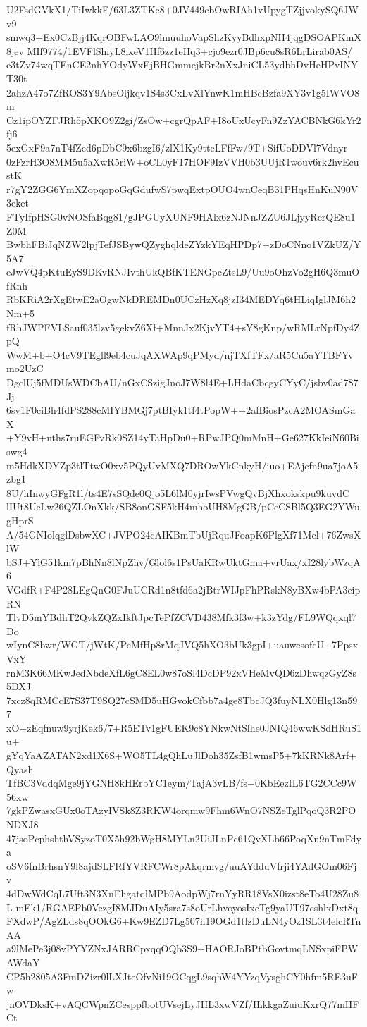 U2FsdGVkX1/TiIwkkF/63L3ZTKe8+0JV449cbOwRIAh1vUpygTZjjvokySQ6JWv9
smwq3+Ex0CzBjj4KqrOBFwLAO9lmuuhoVapShzKyyBdhxpNH4jqgDSOAPKmX8jev
MIf9774/1EVFlShiyL8ixeV1Hf6zz1eHq3+cjo9ezr0JBp6cu8sR6LrLirab0AS/
c3tZv74wqTEnCE2nhYOdyWxEjBHGmmejkBr2nXxJniCL53ydbhDvHeHPvINYT30t
2ahzA47o7ZfROS3Y9AbsOljkqv1S4s3CxLvXlYnwK1mHBcBzfa9XY3v1g5IWVO8m
Cz1ipOYZFJRh5pXKO9Z2gi/ZsOw+cgrQpAF+I8oUxUcyFn9ZzYACBNkG6kYr2fj6
5exGxF9a7nT4fZcd6pDbC9x6bzgI6/zlX1Ky9tteLFfFw/9T+SifUoDDVl7Vdnyr
0zFzrH3O8MM5u5aXwR5riW+oCL0yF17HOF9IzVVH0b3UUjR1wouv6rk2hvEcustK
r7gY2ZGG6YmXZopqopoGqGdufwS7pwqExtpOUO4wnCeqB31PHqsHnKuN90V3eket
FTyIfpHSG0vNOSfaBqg81/gJPGUyXUNF9HAlx6zNJNnJZZU6JLjyyRcrQE8u1Z0M
BwbhFBiJqNZW2lpjTefJSBywQZyghqldeZYzkYEqHPDp7+zDoCNno1VZkUZ/Y5A7
eJwVQ4pKtuEyS9DKvRNJIvthUkQBfKTENGpcZtsL9/Uu9oOhzVo2gH6Q3muOfRnh
RbKRiA2rXgEtwE2aOgwNkDREMDn0UCzHzXq8jzI34MEDYq6tHLiqIglJM6h2Nm+5
fRhJWPFVLSauf035lzv5gekvZ6Xf+MnnJx2KjvYT4+sY8gKnp/wRMLrNpfDy4ZpQ
WwM+b+O4cV9TEgll9eb4cuJqAXWAp9qPMyd/njTXfTFx/aR5Cu5aYTBFYvmo2UzC
DgclUj5fMDUsWDCbAU/nGxCSzigJnoJ7W8l4E+LHdaCbcgyCYyC/jsbv0ad787Jj
6sv1F0ciBh4fdPS288cMIYBMGj7ptBIyk1tf4tPopW++2afBiosPzcA2MOASmGaX
+Y9vH+nths7ruEGFvRk0SZ14yTaHpDu0+RPwJPQ0mMnH+Ge627KkIeiN60Biswg4
m5HdkXDYZp3tlTtwO0xv5PQyUvMXQ7DROwYkCnkyH/iuo+EAjcfn9ua7joA5zbg1
8U/hInwyGFgR1l/ts4E7sSQde0Qjo5L6lM0yjrIwsPVwgQvBjXhxokskpu9kuvdC
lIUt8UeLw26QZLOnXkk/SB8onGSF5kH4mhoUH8MgGB/pCeCSBl5Q3EG2YWugHprS
A/54GNIolqglDsbwXC+JVPO24cAIKBmTbUjRquJFoapK6PlgXf71Mcl+76ZwsXlW
bSJ+YlG51km7pBhNn8lNpZhv/Glol6s1PsUaKRwUktGma+vrUax/xI28lybWzqA6
VGdfR+F4P28LEgQnG0FJuUCRd1n8tfd6a2jBtrWIJpFhPRskN8yBXw4bPA3eipRN
TlvD5mYBdhT2QvkZQZxIkftJpcTePfZCVD438Mfk3f3w+k3zYdg/FL9WQqxql7Do
wIynC8bwr/WGT/jWtK/PeMfHp8rMqJVQ5hXO3bUk3gpI+uauwcsofcU+7PpsxVxY
rnM3K66MKwJedNbdeXfL6gC8EL0w87oSl4DcDP92xVHeMvQD6zDhwqzGyZ8s5DXJ
7xcz8qRMCcE7S37T9SQ27cSMD5uHGvokCfbb7a4ge8TbcJQ3fuyNLX0Hlg13n597
xO+zEqfnuw9yrjKek6/7+R5ETv1gFUEK9c8YNkwNtSlhe0JNIQ46wwKSdHRuS1u+
gYqYaAZATAN2xd1X6S+WO5TL4gQhLuJlDoh35ZsfB1wmsP5+7kKRNk8Arf+Qyash
TfBC3VddqMge9jYGNH8kHErbYC1eym/TajA3vLB/fs+0KbEezIL6TG2CCc9W56xw
7gkPZwasxGUx0oTAzyIVSk8Z3RKW4orqmw9Fhm6WnO7NSZeTglPqoQ3R2PONDXJ8
47jsoPcphshthVSyzoT0X5h92bWgH8MYLn2UiJLnPc61QvXLb66PoqXn9nTmFdya
oSV6fnBrhsnY9l8ajdSLFRfYVRFCWr8pAkqrmvg/uuAYdduVfrji4YAdGOm06Fjv
4dDwWdCqL7Uft3N3XnEhgatqlMPb9AodpWj7rnYyRR18VsX0izst8eTo4U28Zu8L
mEk1/RGAEPb0VezgI8MJDuAIy5sra7s8oUrLhvoyosIxcTg9yaUT97cshlxDxt8q
FXdwP/AgZLds8qOOkG6+Kw9EZD7Lg507h19OGd1tlzDuLN4yOz1SL3t4elcRTnAA
a9lMePe3j08vPYYZNxJARRCpxqqOQb3S9+HAORJoBPtbGovtmqLNSxpiFPWAWdaY
CP5h2805A3FmDZizr0lLXJteOfvNi19OCqgL9sqhW4YYzqVysghCY0hfm5RE3uFw
jnOVDksK+vAQCWpnZCesppfbotUVsejLyJHL3xwVZf/ILkkgaZuiuKxrQ77mHFCt
